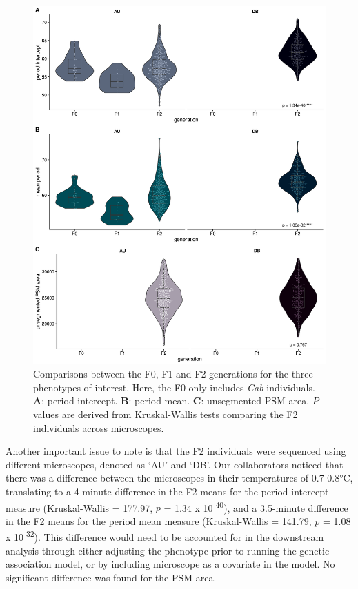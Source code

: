 \documentclass[
]{book}
\begin{document}
\begin{figure}
\includegraphics[width=1\linewidth]{figs/somites/phenotypes} \caption{Comparisons between the F0, F1 and F2 generations for the three phenotypes of interest. Here, the F0 only includes \emph{Cab} individuals. \textbf{A}: period intercept. \textbf{B}: period mean. \textbf{C}: unsegmented PSM area. \(P\)-values are derived from Kruskal-Wallis tests comparing the F2 individuals across microscopes.}\label{fig:somite-phenos}
\end{figure}

Another important issue to note is that the F2 individuals were sequenced using different microscopes, denoted as `AU' and `DB'. Our collaborators noticed that there was a difference between the microscopes in their temperatures of 0.7-0.8°C, translating to a 4-minute difference in the F2 means for the period intercept measure (Kruskal-Wallis = 177.97, \(p\) = 1.34 x 10\textsuperscript{-40}), and a 3.5-minute difference in the F2 means for the period mean measure (Kruskal-Wallis = 141.79, \(p\) = 1.08 x 10\textsuperscript{-32}). This difference would need to be accounted for in the downstream analysis through either adjusting the phenotype prior to running the genetic association model, or by including microscope as a covariate in the model. No significant difference was found for the PSM area.
\end{document}
